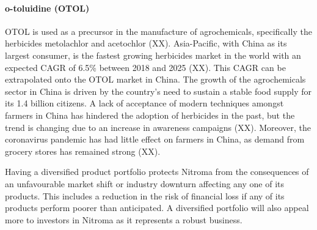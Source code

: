 \paragraph{o-toluidine (OTOL)}
OTOL is used as a precursor in the manufacture of agrochemicals, specifically the herbicides metolachlor and acetochlor (XX). Asia-Pacific, with China as its largest consumer, is the fastest growing herbicides market in the world with an expected CAGR of 6.5\% between 2018 and 2025 (XX). This CAGR can be extrapolated onto the OTOL market in China. The growth of the agrochemicals sector in China is driven by the country’s need to sustain a stable food supply for its 1.4 billion citizens. A lack of acceptance of modern techniques amongst farmers in China has hindered the adoption of herbicides in the past, but the trend is changing due to an increase in awareness campaigns (XX). Moreover, the coronavirus pandemic has had little effect on farmers in China, as demand from grocery stores has remained strong (XX).

Having a diversified product portfolio protects Nitroma from the consequences of an unfavourable market shift or industry downturn affecting any one of its products. This includes a reduction in the risk of financial loss if any of its products perform poorer than anticipated. A diversified portfolio will also appeal more to investors in Nitroma as it represents a robust business. 

